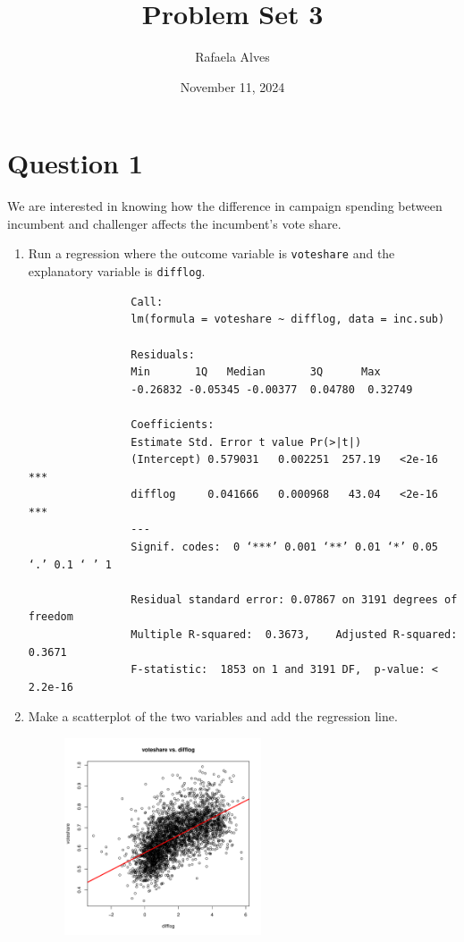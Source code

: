 \documentclass[12pt,letterpaper]{article}
\title{Problem Set 3}
\date{November 11, 2024}
\author{Rafaela Alves}
\begin{document}
	\maketitle

\section*{Question 1}
\vspace{.25cm}
\noindent We are interested in knowing how the difference in campaign spending between incumbent and challenger affects the incumbent's vote share. 
	\begin{enumerate}
		
		
		\item Run a regression where the outcome variable is \texttt{voteshare} and the explanatory variable is \texttt{difflog}.	
				\vspace{.25cm}
				  
				\begin{verbatim}
				Call:
				lm(formula = voteshare ~ difflog, data = inc.sub)
				
				Residuals:
				Min       1Q   Median       3Q      Max 
				-0.26832 -0.05345 -0.00377  0.04780  0.32749 
				
				Coefficients:
				Estimate Std. Error t value Pr(>|t|)    
				(Intercept) 0.579031   0.002251  257.19   <2e-16 ***
				difflog     0.041666   0.000968   43.04   <2e-16 ***
				---
				Signif. codes:  0 ‘***’ 0.001 ‘**’ 0.01 ‘*’ 0.05 ‘.’ 0.1 ‘ ’ 1
				
				Residual standard error: 0.07867 on 3191 degrees of freedom
				Multiple R-squared:  0.3673,	Adjusted R-squared:  0.3671 
				F-statistic:  1853 on 1 and 3191 DF,  p-value: < 2.2e-16
			\end{verbatim}
		
		
		\newpage
		
		
		\item Make a scatterplot of the two variables and add the regression line. 	
				\begin{figure}[h!]
				\centering
				\includegraphics[width=0.55\textwidth]{plot_question1.pdf}
				\end{figure}
				\vspace{.4cm}
			

\end{enumerate}
\end{document}
